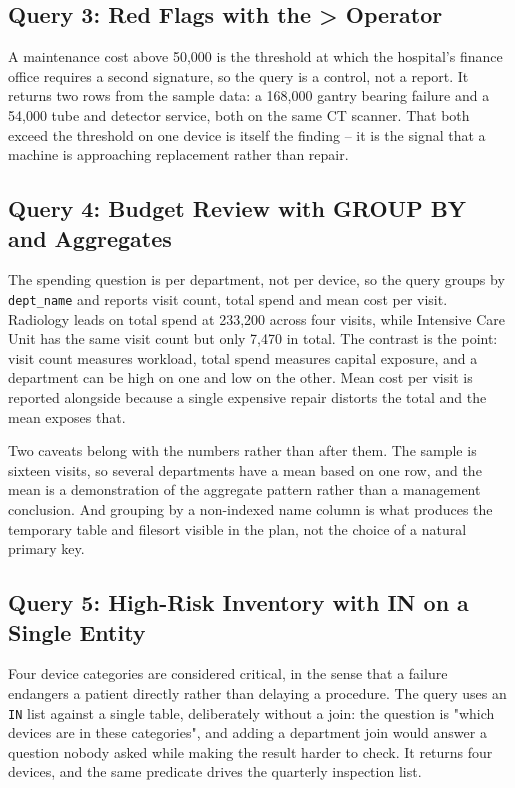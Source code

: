 \documentclass[conference,9pt]{IEEEtran}
\begin{document}
\subsection{Query 3: Red Flags with the \textgreater{} Operator}
A maintenance cost above 50,000 is the threshold at which the hospital's
finance office requires a second signature, so the query is a control, not a
report. It returns two rows from the sample data: a 168,000 gantry bearing
failure and a 54,000 tube and detector service, both on the same CT scanner.
That both exceed the threshold on one device is itself the finding -- it is the
signal that a machine is approaching replacement rather than repair.

\subsection{Query 4: Budget Review with GROUP BY and Aggregates}
The spending question is per department, not per device, so the query groups
by \texttt{dept\_name} and reports visit count, total spend and mean cost per
visit. Radiology leads on total spend at 233,200 across four visits, while
Intensive Care Unit has the same visit count but only 7,470 in total. The
contrast is the point: visit count measures workload, total spend measures
capital exposure, and a department can be high on one and low on the other.
Mean cost per visit is reported alongside because a single expensive repair
distorts the total and the mean exposes that.

Two caveats belong with the numbers rather than after them. The sample is
sixteen visits, so several departments have a mean based on one row, and the
mean is a demonstration of the aggregate pattern rather than a management
conclusion. And grouping by a non-indexed name column is what produces the
temporary table and filesort visible in the plan, not the choice of a natural
primary key.

\subsection{Query 5: High-Risk Inventory with IN on a Single Entity}
Four device categories are considered critical, in the sense that a failure
endangers a patient directly rather than delaying a procedure. The query uses
an \texttt{IN} list against a single table, deliberately without a join: the
question is "which devices are in these categories", and adding a department
join would answer a question nobody asked while making the result harder to
check. It returns four devices, and the same predicate drives the quarterly
inspection list.
\end{document}
